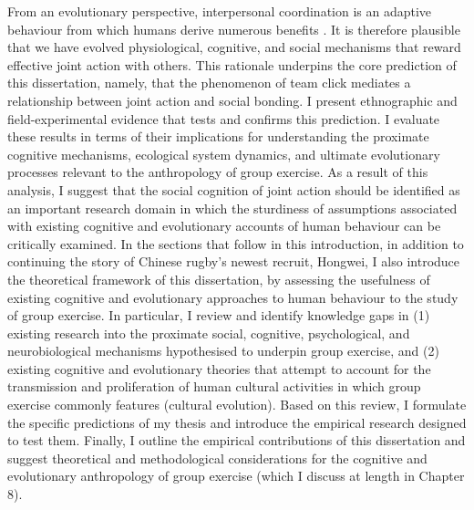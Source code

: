From an evolutionary perspective, interpersonal coordination is an adaptive behaviour from which humans derive numerous benefits \citep{Tomasello2014}. It is therefore plausible that we have evolved physiological, cognitive, and social mechanisms that reward effective joint action with others. This rationale underpins the core prediction of this dissertation, namely, that the phenomenon of team click mediates a relationship between joint action and social bonding.  I present ethnographic and field-experimental evidence that tests and confirms this prediction.  I evaluate these results in terms of their implications for understanding the proximate cognitive mechanisms, ecological system dynamics, and ultimate evolutionary processes relevant to the anthropology of group exercise.  As a result of this analysis, I suggest that the social cognition of joint action should be identified as an important research domain in which the sturdiness of assumptions associated with existing cognitive and evolutionary accounts of human behaviour can be critically examined.
In the sections that follow in this introduction, in addition to continuing the story of Chinese rugby's newest recruit, Hongwei, I also introduce the theoretical framework of this dissertation, by assessing the usefulness of existing cognitive and evolutionary approaches to human behaviour to the study of group exercise.  In particular, I review and identify knowledge gaps in (1) existing research into the proximate social, cognitive, psychological, and neurobiological mechanisms hypothesised to underpin group exercise, and (2) existing cognitive and evolutionary theories that attempt to account for the transmission and proliferation of human cultural activities in which group exercise commonly features (cultural evolution). Based on this review, I formulate the specific predictions of my thesis and introduce the empirical research designed to test them.  Finally, I outline the empirical contributions of this dissertation and suggest theoretical and methodological considerations for the cognitive and evolutionary anthropology of group exercise (which I discuss at length in Chapter 8).

